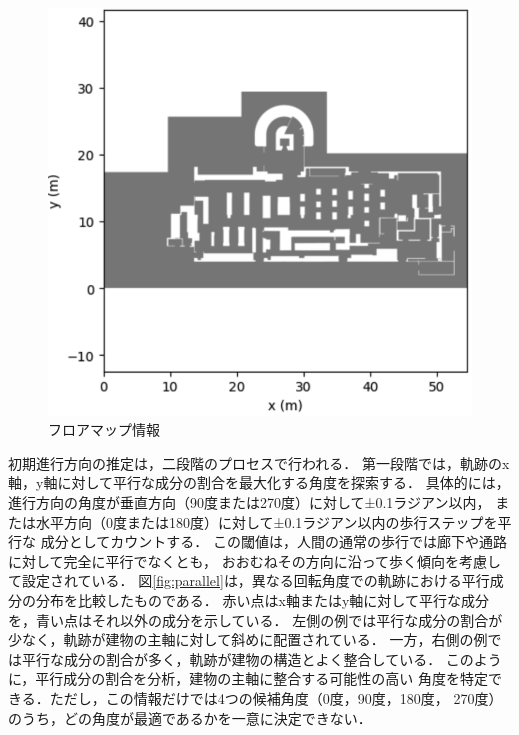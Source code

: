 \begin{figure}[H]
	\centering
	\includegraphics[width=\linewidth]{../image/floor-map.jpg}
  \caption{フロアマップ情報} \label{fig:floor-map}
\end{figure}

初期進行方向の推定は，二段階のプロセスで行われる．
第一段階では，軌跡のx軸，y軸に対して平行な成分の割合を最大化する角度を探索する．
具体的には，進行方向の角度が垂直方向（90度または270度）に対して±0.1ラジアン以内，
または水平方向（0度または180度）に対して±0.1ラジアン以内の歩行ステップを平行な
成分としてカウントする．
この閾値は，人間の通常の歩行では廊下や通路に対して完全に平行でなくとも，
おおむねその方向に沿って歩く傾向を考慮して設定されている．
図\ref{fig:parallel}は，異なる回転角度での軌跡における平行成分の分布を比較したものである．
赤い点はx軸またはy軸に対して平行な成分を，青い点はそれ以外の成分を示している．
左側の例では平行な成分の割合が少なく，軌跡が建物の主軸に対して斜めに配置されている．
一方，右側の例では平行な成分の割合が多く，軌跡が建物の構造とよく整合している．
このように，平行成分の割合を分析，建物の主軸に整合する可能性の高い
角度を特定できる．ただし，この情報だけでは4つの候補角度（0度，90度，180度，
270度）のうち，どの角度が最適であるかを一意に決定できない．

